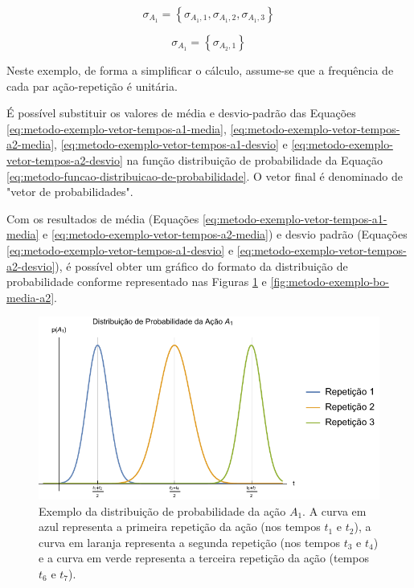 \begin{equation}
    \sigma_{A_1} = \left\{
		\sigma_{{A_1},1}, 
		\sigma_{{A_1},2}, 	
		\sigma_{{A_1},3}
	\right\}
	\label{eq:metodo-exemplo-vetor-tempos-a1-desvio}
\end{equation}

\begin{equation}
    \sigma_{A_1} = \left\{
		\sigma_{{A_2},1}
	\right\}
	\label{eq:metodo-exemplo-vetor-tempos-a2-desvio}
\end{equation}

Neste exemplo, de forma a simplificar o cálculo, assume-se que a frequência de cada par ação-repetição é unitária.

É possível substituir os valores de média e desvio-padrão das Equações \ref{eq:metodo-exemplo-vetor-tempos-a1-media}, \ref{eq:metodo-exemplo-vetor-tempos-a2-media}, \ref{eq:metodo-exemplo-vetor-tempos-a1-desvio} e \ref{eq:metodo-exemplo-vetor-tempos-a2-desvio} na função distribuição de probabilidade da Equação \ref{eq:metodo-funcao-distribuicao-de-probabilidade}. O vetor final é denominado de "vetor de probabilidades".

Com os resultados de média (Equações \ref{eq:metodo-exemplo-vetor-tempos-a1-media} e \ref{eq:metodo-exemplo-vetor-tempos-a2-media}) e desvio padrão (Equações \ref{eq:metodo-exemplo-vetor-tempos-a1-desvio} e \ref{eq:metodo-exemplo-vetor-tempos-a2-desvio}), é possível obter um gráfico do formato da distribuição de probabilidade conforme representado nas Figuras \ref{fig:metodo-exemplo-bo-media-a1} e \ref{fig:metodo-exemplo-bo-media-a2}.

\begin{figure}[htb]
	\caption{\label{fig:metodo-exemplo-bo-media-a1} Exemplo da distribuição de probabilidade da ação $A_1$. A curva em azul representa a primeira repetição da ação (nos tempos $t_1$ e $t_2$), a curva em laranja representa a segunda repetição (nos tempos $t_3$ e $t_4$) e a curva em verde representa a terceira repetição da ação (tempos $t_6$ e $t_7$).}
	\begin{center}
	    \includegraphics[width=\linewidth]{../Mathematica/Images/Exemplo_BO_Media_A1.pdf}
	\end{center}
\end{figure}


